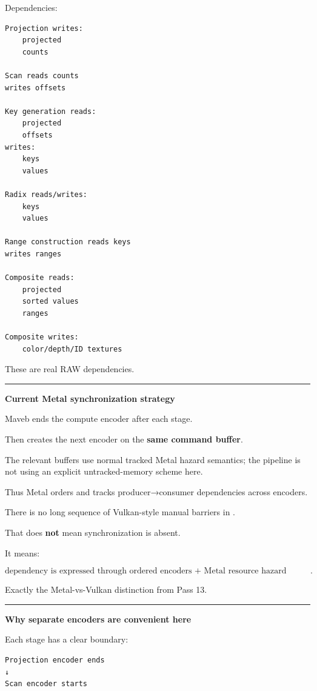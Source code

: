 Dependencies:

\protect{}\label{sd09sx}%
\begin{verbatim}
Projection writes:
    projected
    counts

Scan reads counts
writes offsets

Key generation reads:
    projected
    offsets
writes:
    keys
    values

Radix reads/writes:
    keys
    values

Range construction reads keys
writes ranges

Composite reads:
    projected
    sorted values
    ranges

Composite writes:
    color/depth/ID textures
\end{verbatim}

These are real RAW dependencies.

\begin{center}\rule{0.5\linewidth}{0.5pt}\end{center}

\textbf{Current Metal synchronization strategy}

Maveb ends the compute encoder after each stage.

Then creates the next encoder on the \textbf{same command buffer}.

The relevant buffers use normal tracked Metal hazard semantics; the pipeline is not using an explicit untracked-memory scheme here.

Thus Metal orders and tracks producer→consumer dependencies across encoders.

There is no long sequence of Vulkan-style manual barriers in .

That does \textbf{not} mean synchronization is absent.

It means:

\[
\boxed{
\text{dependency is expressed through ordered encoders + Metal resource hazard tracking}.
}
\]

Exactly the Metal-vs-Vulkan distinction from Pass 13.

\begin{center}\rule{0.5\linewidth}{0.5pt}\end{center}

\textbf{Why separate encoders are convenient here}

Each stage has a clear boundary:

\protect{}\label{9acmg5}%
\begin{verbatim}
Projection encoder ends
↓
Scan encoder starts
\end{verbatim}

